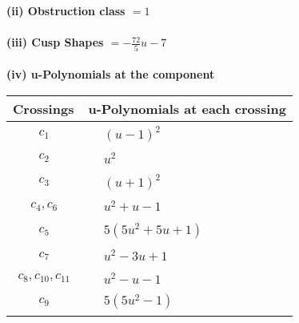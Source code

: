 \documentclass[1p]{elsarticle_modified}
\theoremstyle{definition}
\begin{document}
\flushleft \textbf{(ii) Obstruction class $= 1$}\\~\\
\flushleft \textbf{(iii) Cusp Shapes $= -\frac{72}{5} u-7$}\\~\\
\newpage\renewcommand{\arraystretch}{1}
\flushleft \textbf{(iv) u-Polynomials at the component}\newline \\
\begin{tabular}{m{50pt}|m{274pt}}
Crossings & \hspace{64pt}u-Polynomials at each crossing \\
\hline $$\begin{aligned}c_{1}\end{aligned}$$&$\begin{aligned}
&(u-1)^2
\end{aligned}$\\
\hline $$\begin{aligned}c_{2}\end{aligned}$$&$\begin{aligned}
&u^2
\end{aligned}$\\
\hline $$\begin{aligned}c_{3}\end{aligned}$$&$\begin{aligned}
&(u+1)^2
\end{aligned}$\\
\hline $$\begin{aligned}c_{4},c_{6}\end{aligned}$$&$\begin{aligned}
&u^2+u-1
\end{aligned}$\\
\hline $$\begin{aligned}c_{5}\end{aligned}$$&$\begin{aligned}
&5(5 u^2+5 u+1)
\end{aligned}$\\
\hline $$\begin{aligned}c_{7}\end{aligned}$$&$\begin{aligned}
&u^2-3 u+1
\end{aligned}$\\
\hline $$\begin{aligned}c_{8},c_{10},c_{11}\end{aligned}$$&$\begin{aligned}
&u^2- u-1
\end{aligned}$\\
\hline $$\begin{aligned}c_{9}\end{aligned}$$&$\begin{aligned}
&5(5 u^2-1)
\end{aligned}$\\
\hline
\end{tabular}\\~\\
\end{document}
